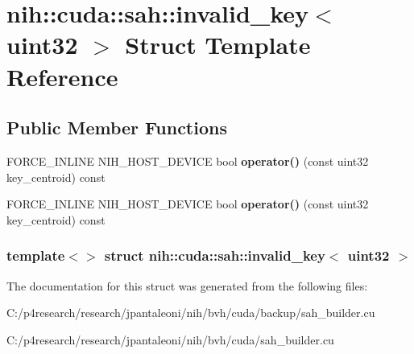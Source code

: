 \hypertarget{structnih_1_1cuda_1_1sah_1_1invalid__key_3_01uint32_01_4}{
\section{nih\-:\-:cuda\-:\-:sah\-:\-:invalid\-\_\-key$<$ uint32 $>$ \-Struct \-Template \-Reference}
\label{structnih_1_1cuda_1_1sah_1_1invalid__key_3_01uint32_01_4}
}
\subsection*{\-Public \-Member \-Functions}
\begin{DoxyCompactItemize}
\item 
\hypertarget{structnih_1_1cuda_1_1sah_1_1invalid__key_3_01uint32_01_4_a5bf5968077ea41fc5395917f174aa61c}{
\-F\-O\-R\-C\-E\-\_\-\-I\-N\-L\-I\-N\-E \-N\-I\-H\-\_\-\-H\-O\-S\-T\-\_\-\-D\-E\-V\-I\-C\-E bool {\bfseries operator()} (const uint32 key\-\_\-centroid) const }
\label{structnih_1_1cuda_1_1sah_1_1invalid__key_3_01uint32_01_4_a5bf5968077ea41fc5395917f174aa61c}

\item 
\hypertarget{structnih_1_1cuda_1_1sah_1_1invalid__key_3_01uint32_01_4_a5bf5968077ea41fc5395917f174aa61c}{
\-F\-O\-R\-C\-E\-\_\-\-I\-N\-L\-I\-N\-E \-N\-I\-H\-\_\-\-H\-O\-S\-T\-\_\-\-D\-E\-V\-I\-C\-E bool {\bfseries operator()} (const uint32 key\-\_\-centroid) const }
\label{structnih_1_1cuda_1_1sah_1_1invalid__key_3_01uint32_01_4_a5bf5968077ea41fc5395917f174aa61c}

\end{DoxyCompactItemize}
\subsubsection*{template$<$$>$ struct nih\-::cuda\-::sah\-::invalid\-\_\-key$<$ uint32 $>$}



\-The documentation for this struct was generated from the following files\-:\begin{DoxyCompactItemize}
\item 
\-C\-:/p4research/research/jpantaleoni/nih/bvh/cuda/backup/sah\-\_\-builder.\-cu\item 
\-C\-:/p4research/research/jpantaleoni/nih/bvh/cuda/sah\-\_\-builder.\-cu\end{DoxyCompactItemize}
